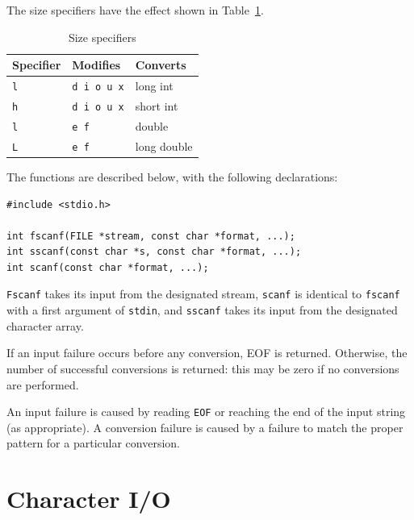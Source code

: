    The size specifiers have the effect shown in Table~\ref{tab:sizeSpec}.


   \begin{table}[htb]
     \centering
     \begin{tabular}{lll}
       \toprule
       Specifier  & Modifies           & Converts    \\
       \midrule
       \texttt{l} & \texttt{d i o u x} & long int    \\
       \texttt{h} & \texttt{d i o u x} & short int    \\
       \texttt{l} & \texttt{e f}       & double    \\
       \texttt{L} & \texttt{e f}       & long double    \\
       \bottomrule
     \end{tabular}
     \caption{\label{tab:sizeSpec}Size specifiers}
   \end{table}


   The functions are described below, with the following declarations:


   \begin{Verbatim}
#include <stdio.h>

int fscanf(FILE *stream, const char *format, ...);
int sscanf(const char *s, const char *format, ...);
int scanf(const char *format, ...);
\end{Verbatim}

   \texttt{Fscanf} takes its input from the designated stream,
    \texttt{scanf}  is identical  to  \texttt{fscanf}  with  a  first
    argument of \texttt{stdin}, and \texttt{sscanf} takes its input
    from the designated character array.


   If an input failure occurs before  any  conversion,  EOF  is returned.
    Otherwise,  the number of successful conversions is  returned:  this  may
    be  zero  if  no  conversions  are performed.


   An input failure is caused by reading \texttt{EOF}  or  reaching  the
    end  of  the  input  string  (as appropriate).  A conversion failure is
    caused by a failure to match the  proper  pattern for a particular
    conversion.


  

 
        \section{Character I/O}
        

